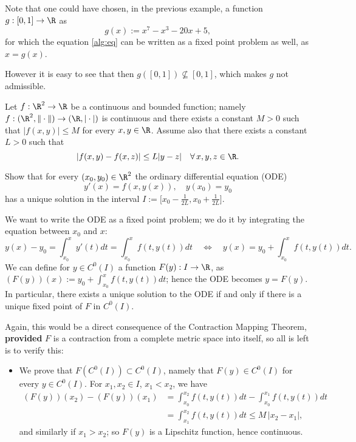 \begin{remark}
Note that one could have chosen, in the previous example, a function $g:[0,1]\to \R$ as 
$$
g(x):= x^7 - x^3 - 20 x + 5,
$$
for which the equation \eqref{alg:eq} can be written as a fixed point problem as well, as $x = g(x)$.

However it is easy to see that then $g([0,1]) \nsubseteq [0,1]$, which makes $g$  not admissible.
\end{remark}

\np

\begin{example}
Let $f:\R^2 \to \R$ be a continuous and bounded function; namely $f: (\R^2,\|\cdot \|) \to (\R, |\cdot|)$ is continuous and there exists a constant $M>0$ such that 
$|f(x,y)|\leq M$ for every $x, y\in \R$. Assume also that there exists a constant $L>0$ such that 
\begin{equation}\label{L2}
|f(x,y)-f(x,z)| \leq L|y-z| \quad \forall \,  x, y, z\in \R.
\end{equation}%

Show that for every $(x_0,y_0) \in \R^2$ the ordinary differential equation (ODE)
\begin{equation}\label{ODE}
y'(x) = f(x,y(x)), \quad y(x_0)=y_0
\end{equation}
has a unique solution in the interval $I:= \big[x_0-\frac{1}{2L}, x_0+\frac{1}{2L}\big]$.
\bigskip

We want to write the ODE as a fixed point problem; we do it by integrating the equation between $x_0$ and $x$:
$$
y(x) - y_0 = \int_{x_0}^x y'(t) dt = \int_{x_0}^x f(t,y(t)) dt  \quad \Leftrightarrow \quad y(x) = y_0 + \int_{x_0}^x f(t,y(t)) dt.
$$
We can define for $y\in C^0(I)$ a function $F(y): I\to \R$, as $(F(y))(x):= y_0 + \int_{x_0}^x f(t,y(t)) dt$; hence the ODE becomes $y = F(y)$. 
In particular, there exists a unique solution to the ODE if and only if there is a unique fixed point of $F$ in $C^0(I)$.
\medskip

Again, this would be a direct consequence of the Contraction Mapping Theorem, \textbf{provided} $F$ is a contraction from a complete metric space into itself,  so all is left is to verify this:

\begin{itemize}
\item We prove that $F(C^0(I))\subset C^0(I)$, namely that $F(y) \in C^0(I)$ for every $y \in C^0(I)$. For $x_1,x_2\in I$, $x_1<x_2$, we have 
\begin{align*}
(F(y))(x_2) - (F(y))(x_1) &= \int_{x_0}^{x_2} f(t,y(t)) dt - \int_{x_0}^{x_1} f(t,y(t)) dt \\&= \int_{x_1}^{x_2} f(t,y(t)) dt \leq M\, \left|x_2-x_1\right|,
\end{align*}%
and similarly if $x_1>x_2$; so $F(y)$ is a Lipschitz function, hence continuous. 


\end{itemize}
\end{example}
